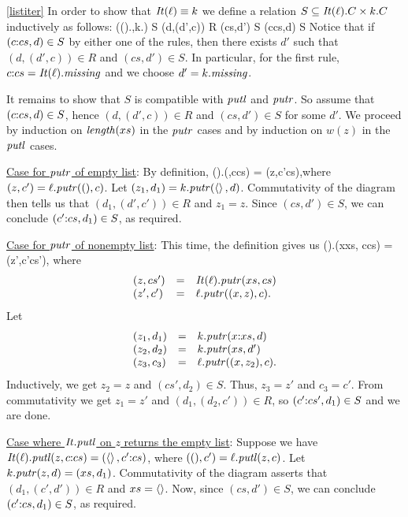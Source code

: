 \begin{defn}[$R$-similarity]
\begin{theorem}
\begin{lemma}
\begin{theorem}[No products]
\begin{lemma}
\begin{defn}
\begin{theorem}
\begin{theorem}
\begin{pfof}{\ref{listiter}}
In order to show that $\mathit{It}(\ell) \equiv k$ we define a relation $S \subseteq
\mathit{It}(\ell).C \times k.C$ inductively as follows: 
\infax
  {(\IT(\ell).\missing,k.\missing) \in S}
\infrule
  {(d,(d',c)) \in R  \andalso  (cs,d') \in S}
  {(c{\CONS}cs,d) \in S}
Notice that if $(c{\mathord{:}}cs,d)\in S$ by either one of the rules, then there
exists 
$d'$ such that $(d,(d',c)) \in R$ and $(cs,d') \in S$.  In particular, for
the first rule, $c{\mathord{:}}cs=\mathit{It}(\ell).\mathit{missing}$ and we choose $d'=k.\mathit{missing}$.

It remains to show that $S$ is compatible with $\mathit{putl}$ and $\mathit{putr}$.  So
assume that $(c{\mathord{:}}cs,d) \in S$, hence $(d,(d',c)) \in R$ and $(cs,d')
\in S$ for some $d'$. We proceed by induction on $\mathit{length}(xs)$ in the $\mathit{putr}$
cases and by induction on $w(z)$ in the $\mathit{putl}$ cases.

\smallskip \noindent
\underline{Case for $\mathit{putr}$ of empty list}: 
By definition,
%
\dissdis\IT(\ell).\putr(\NIL,c{\CONS}cs) = (z,c'{\CONS}cs),\dissdis where $(z,c') =
\ell.\mathit{putr}({()},c)$.
%        
Let $(z_1,d_1) = k.\mathit{putr}(\left<\right>,d)$. 
%
Commutativity of the diagram
then tells us that $(d_1,(d',c')) \in R$ and $z_1=z$.  Since $(cs,d') \in S$, we
can conclude $(c'{\mathord{:}}cs,d_1) \in S$, as required.
        
\smallskip \noindent
\underline{Case for $\mathit{putr}$ of nonempty list}:  This time, the definition
gives us
\dissdis\IT(\ell).\putr(x{\CONS}xs, c{\CONS}cs) = (z',c'{\CONS}cs'),\dissdis
where
\[
\begin{array}{lcl}
(z,cs') &=& \mathit{It}(\ell).\mathit{putr}(xs,cs) \\
(z',c') &=& \ell.\mathit{putr}((x,z),c).
\end{array}
\]
%
Let 
\[
\begin{array}{lcl}
(z_1,d_1) &=& k.\mathit{putr}(x{\mathord{:}}xs,d) \\
(z_2,d_2) &=& k.\mathit{putr}(xs,d')  \\
(z_3,c_3) &=& \ell.\mathit{putr}((x,z_2),c).
\end{array}
\]
Inductively, we get $z_2=z$ and $(cs',d_2) \in S$. Thus, $z_3=z'$ and
$c_3=c'$.  From commutativity we get $z_1 = z'$ and $(d_1,(d_2,c')) \in R$, so
$(c'{\mathord{:}}cs',d_1) \in S$ and we are done.  

\smallskip \noindent
\underline{Case where $\mathit{It}.\mathit{putl}$ on $z$ returns the empty list}: 
Suppose we have
%
        $\mathit{It}(\ell).\mathit{putl}(z,c\mathord{:}{}cs) = (\left<\right>,c'\mathord{:}{}cs)$, where 
        $({()},c') = \ell.\mathit{putl}(z,c)$.
        Let $k.\mathit{putr}(z,d) = (xs,d_1)$.  Commutativity of the diagram
        asserts that $(d_1,(c',d')) \in R$ and $xs=\left<\right>$. Now, since
        $(cs,d')\in S$, we can conclude $(c'\mathord{:}{}cs,d_1) \in S$, as
        required.


\end{pfof}
\end{theorem}
\end{theorem}
\end{defn}
\end{lemma}
\end{theorem}
\end{lemma}
\end{theorem}
\end{defn}
